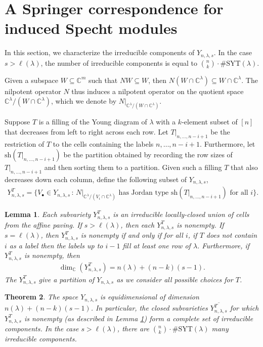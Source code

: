 \documentclass[submission]{FPSAC2021}
\theoremstyle{plain}
\newtheorem{theorem}{Theorem}[section]
\newtheorem{lemma}[theorem]{Lemma}
\numberwithin{equation}{section}
\newcommand{\bC}{\mathbb{C}}
\newcommand{\st}{\,:\,}
\newcommand{\la}{\lambda}
\newcommand{\SYT}{\mathrm{SYT}}
\begin{document}
\section{A Springer correspondence for induced Specht modules}\label{sec:InducedSpecht}


In this section, we characterize the irreducible components of $Y_{n,\la,s}$. In the case $s>\ell(\la)$, the number of irreducible components is equal to $\binom{n}{k}\cdot\#\SYT(\la)$.

Given a subspace $W\subseteq \bC^m$ such that $NW\subseteq W$, then $N(W\cap\bC^\lambda)\subseteq W\cap \bC^\lambda$. The nilpotent operator $N$ thus induces a nilpotent operator on the quotient space $\bC^\lambda/(W\cap \bC^\lambda)$, which we denote by $N|_{\bC^\lambda/(W\cap \bC^\lambda)}$.

Suppose $T$ is a filling of the Young diagram of $\lambda$ with a $k$-element subset of $[n]$ that decreases from left to right across each row. Let $T|_{n,\dots, n-i+1}$ be the restriction of $T$ to the cells containing the labels $n,\dots, n-i+1$. Furthermore, let $\mathrm{sh}(T|_{n,\dots, n-i+1})$ be the partition obtained by recording the row sizes of $T|_{n,\dots, n-i+1}$ and then sorting them to a partition.
Given such a filling $T$ that also decreases down each column, define the following subset of $Y_{n,\la,s}$,
\begin{align}
Y_{n,\la,s}^{T} = \{V_\bullet \in Y_{n,\la,s} \st N|_{\bC^\lambda/(V_i\cap \bC^\lambda)}\text{ has Jordan type }\mathrm{sh}(T|_{n,\dots,n-i+1})\text{ for all }i\}.
\end{align}


\begin{lemma}
\label{lem:Jordan}
Each subvariety $Y_{n,\la,s}^{T}$ is an irreducible locally-closed union of cells from the affine paving.
If $s>\ell(\la)$, then each $Y_{n,\la,s}^{T}$ is nonempty. If $s = \ell(\la)$, then $Y_{n,\la,s}^{T}$ is nonempty if and only if for all $i$, if $T$ does not contain $i$ as a label then the labels up to $i-1$ fill at least one row of $\lambda$. Furthermore, if $Y_{n,\la,s}^{T}$ is nonempty, then
\begin{align}\label{eq:DimFormulaForCmpt}
\dim_\bC(Y_{n,\la,s}^{T}) = n(\la) + (n-k)(s-1).
\end{align}
The $Y_{n,\la,s}^{T}$ give a partition of $Y_{n,\la,s}$ as we consider all possible choices for $T$.
\end{lemma}

\begin{theorem}
The space $Y_{n,\la,s}$ is equidimensional of dimension $n(\la) + (n-k)(s-1)$.  In particular, the closed subvarieties $\overline{Y_{n,\la,s}^{T}}$ for which $Y_{n,\la,s}^{T}$ is nonempty (as described in Lemma \ref{lem:Jordan}) form a complete set of irreducible components. In the case $s>\ell(\la)$, there are $\binom{n}{k}\cdot \#\SYT(\la)$ many irreducible components.
\end{theorem}
\end{document}
